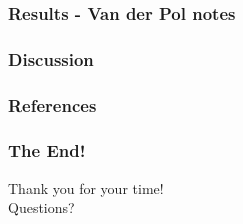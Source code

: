 \documentclass[11pt,aspectratio=169]{beamer}
\begin{document}
    \begin{frame}
        \frametitle{Results - Van der Pol notes}

    \end{frame}

    \begin{frame}
        \frametitle{Discussion}

    \end{frame}


    \begin{frame}
        \frametitle{References}
        
        
    \end{frame}

    \begin{frame}
        \frametitle{The End!}
        \begin{center}
            \LARGE{Thank you for your time!} \\
            \LARGE{Questions?}
        \end{center}
    \end{frame}
\end{document}
